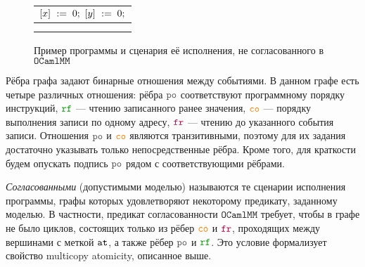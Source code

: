 \documentclass[14pt]{matmex-diploma-custom}
\newcommand{\OMM}{\mathtt{OCaml}\allowbreak \mathtt{MM}}
\newcommand{\defn}[1]{\textit{#1}}
\begin{document}
\begin{figure}[h]
  \centering
  \begin{minipage}{0.45\textwidth}
    \centering
    \begin{tabular}{L || L || L}
       \\
      \hline
       &  &  \\
      {}            &  &  \\
    \end{tabular}
  \end{minipage}\hfill
  \begin{minipage}{0.45\textwidth}
    \centering
  \end{minipage}
  \caption{Пример программы и сценария её исполнения, не согласованного в $\OMM$}
  \label{fig:example-discriminating}
\end{figure}

Рёбра графа задают бинарные отношения между событиями. В данном графе есть четыре
различных отношения: рёбра $\lPO$ соответствуют программному порядку инструкций, $\lRF$ --- чтению записанного ранее значения, $\lCO$ --- порядку выполнения записи по одному адресу, $\lFR$ --- чтению до указанного события записи. Отношения $\lPO$ и $\lCO$ являются транзитивными, поэтому для их задания достаточно указывать только непосредственные рёбра. Кроме того, для краткости будем опускать подпись $\lPO$ рядом с соответствующими рёбрами.

\defn{Согласованными} (допустимыми моделью) называются те сценарии исполнения программы, графы которых удовлетворяют некоторому предикату, заданному моделью. В частности, предикат согласованности $\OMM$ требует, чтобы в графе не было циклов, состоящих только из рёбер $\lCO$ и $\lFR$, проходящих между вершинами с меткой ${\mathtt{at}}$, а также рёбер $\lPO$ и $\lRF$. Это условие формализует свойство multicopy atomicity, описанное выше.
\end{document}
